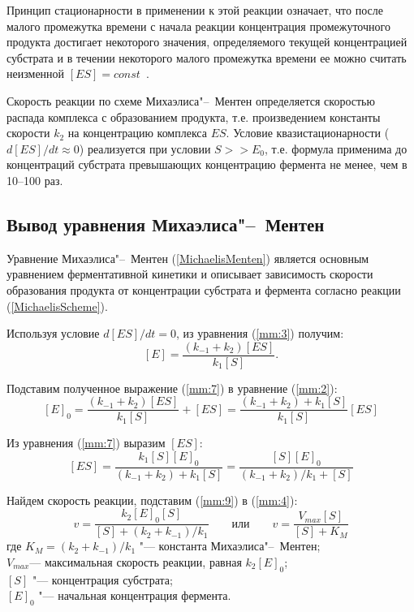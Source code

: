 \documentclass[12pt,a4paper,oneside]{book}
\begin{document}
Принцип стационарности в применении к этой реакции означает, что после малого промежутка времени с начала реакции концентрация промежуточного продукта достигает некоторого значения, определяемого текущей концентрацией субстрата и в течении некоторого малого промежутка времени ее можно считать неизменной $[ES] = const$~\cite{Berezin1979}.

Скорость реакции по схеме Михаэлиса"--~Ментен определяется скоростью распада комплекса с образованием продукта, т.е. произведением константы скорости $k_2$ на концентрацию комплекса $ES$. Условие квазистационарности  ($d[ES]/dt \approx 0$) реализуется при условии  $S >> E_0$, т.е. формула применима до концентраций субстрата превышающих концентрацию фермента не менее, чем в 10--100 раз.

\subsection{Вывод уравнения Михаэлиса"--~Ментен}

Уравнение Михаэлиса"--~Ментен (\ref{MichaelisMenten}) является основным уравнением ферментативной кинетики и описывает зависимость скорости образования продукта от концентрации субстрата и фермента согласно реакции (\ref{MichaelisScheme}).

Используя условие $d[ES]/dt=0$, из уравнения (\ref{mm:3}) получим:
\begin{equation}
	\label{mm:7}
	[E] = \frac{(k_{-1} + k_2) [ES]}{k_1 [S]}.
\end{equation}

Подставим полученное выражение (\ref{mm:7}) в уравнение (\ref{mm:2}):
\begin{equation}
	\label{mm:8}
	[E]_0 = \frac{(k_{-1} + k_2) [ES]}{k_1 [S]} + [ES] = \frac{(k_{-1} + k_2) + k_1 [S]}{k_1 [S]}[ES]
\end{equation}

Из уравнения (\ref{mm:7}) выразим $[ES]$:
\begin{equation}
	\label{mm:9}
	[ES] = \frac{k_1 [S] [E]_0}{(k_{-1} + k_2) + k_1 [S]} = \frac{[S] [E]_0}{(k_{-1} + k_2)/k_1 + [S]}
\end{equation}

Найдем скорость реакции, подставим (\ref{mm:9}) в (\ref{mm:4}):
\begin{equation}
	\label{MichaelisMenten}
	v = \frac{k_2 [E]_0 [S]}{[S] + (k_2 + k_{-1})/k_1}	
	\qquad \text{или} \qquad
	\boxed{v = \frac{V_{max} [S]}{[S] + K_M}}
\end{equation}
где $K_M = (k_2 + k_{-1})/k_1$ "--- константа Михаэлиса"--~Ментен;\\
$V_{max}$--- максимальная скорость реакции, равная $k_2 [E]_0$;\\
$[S]$ "--- концентрация субстрата;\\
$[E]_0$ "--- начальная концентрация фермента.\\
\end{document}
